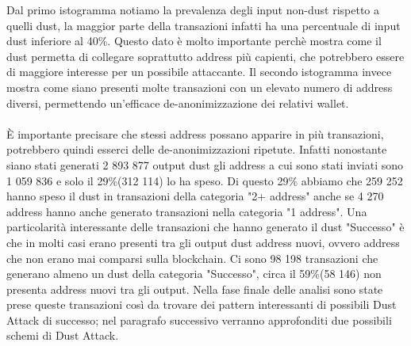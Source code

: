 \FloatBarrier
Dal primo istogramma notiamo la prevalenza degli input non-dust rispetto a quelli dust, la maggior parte della transazioni infatti ha una percentuale di input dust inferiore al 40\%. Questo dato è molto importante perchè mostra come il dust permetta di collegare soprattutto address più capienti, che potrebbero essere di maggiore interesse per un possibile attaccante. Il secondo istogramma invece mostra come siano presenti molte transazioni con un elevato numero di address diversi, permettendo un'efficace de-anonimizzazione dei relativi wallet.\\\\
È importante precisare che stessi address possano apparire in più transazioni, potrebbero quindi esserci delle de-anonimizzazioni ripetute. Infatti nonostante siano stati generati 2 893 877 output dust gli address a cui sono stati inviati sono 1 059 836 e solo il 29\%(312 114) lo ha speso. Di questo 29\% abbiamo che 259 252 hanno speso il dust in transazioni della categoria "2+ address" anche se 4 270 address hanno anche generato transazioni nella categoria "1 address". Una particolarità interessante delle transazioni che hanno generato il dust "Successo" è che in molti casi erano presenti tra gli output dust address nuovi, ovvero address che non erano mai comparsi sulla blockchain. Ci sono 98 198 transazioni che generano almeno un dust della categoria "Successo", circa il 59\%(58 146) non presenta address nuovi tra gli output. Nella fase finale delle analisi sono state prese queste transazioni così da trovare dei pattern interessanti di possibili Dust Attack di successo; nel paragrafo successivo verranno approfonditi due possibili schemi di Dust Attack.  

